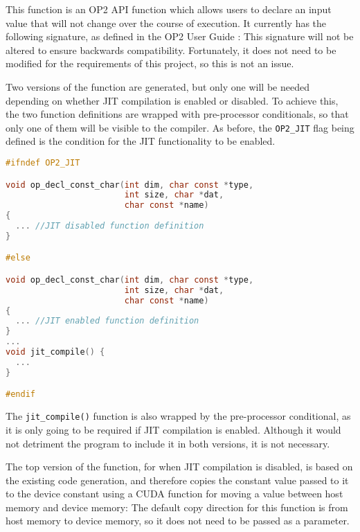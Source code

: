 This function is an OP2 API function which allows users to declare an input value that will not change over the course of execution. It currently has the following signature, as defined in the OP2 User Guide \cite[p9]{manual}:
This signature will not be altered to ensure backwards compatibility. Fortunately, it does not need to be modified for the requirements of this project, so this is not an issue.
\par
Two versions of the function are generated, but only one will be needed depending on whether JIT compilation is enabled or disabled. To achieve this, the two function definitions are wrapped with pre-processor conditionals, so that only one of them will be visible to the compiler. As before, the \verb|OP2_JIT| flag being defined is the condition for the JIT functionality to be enabled.
\begin{lstlisting}[backgroundcolor=\color{red!20}, language=C]
#ifndef OP2_JIT

void op_decl_const_char(int dim, char const *type,
                        int size, char *dat,
                        char const *name)
{
  ... //JIT disabled function definition
}

#else

void op_decl_const_char(int dim, char const *type,
                        int size, char *dat,
                        char const *name)
{
  ... //JIT enabled function definition
}
...
void jit_compile() {
  ...
}

#endif
\end{lstlisting}
The \verb|jit_compile()| function is also wrapped by the pre-processor conditional, as it is only going to be required if JIT compilation is enabled. Although it would not detriment the program to include it in both versions, it is not necessary.

 The top version of the function, for when JIT compilation is disabled, is based on the existing code generation, and therefore copies the constant value passed to it to the device constant using a CUDA function for moving a value between host memory and device memory:
\noindent The default copy direction for this function is from host memory to device memory, so it does not need to be passed as a parameter.

